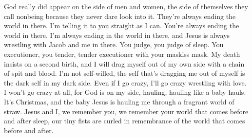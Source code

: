 \documentclass[english,11pt,letterpaper,onecolumn,parskip=full]{scrbook}
\begin{document}
\begin{poem}
\begin{stanza}
God really did appear on the side of men and women, the side of themselves they call nonbeing because they never dare look into it.
They're always ending the world in there.  I'm telling it to you straight as I can.  You're always ending the world in there.  I'm always ending in the world in there, and Jesus is always wrestling with Jacob and me in there.\verseline
You judge, you judge of sleep.  You executioner, you tender, tender executioner with your masklss mask.\verseline
My death insists on a second birth, and I will drag myself out of my own side with a chain of spit and blood.\verseline
I'm not self-willed, the self that's dragging me out of myself is the dark self in my dark side.\verseline
Even if I go crazy, I'll go crazy wrestling with love.\verseline
I won't go crazy at all, for God is on my side, hauling, hauling like a baby hauls.  It's Christmas, and the baby Jesus is hauling me through a fragrant world of straw.\verseline
Jesus and I, we remember you, we remember your world that comes before and after sleep, our tiny fists are curled in remembrance of the world that comes before and after.
\end{stanza}
\end{poem}

	
\end{document}
